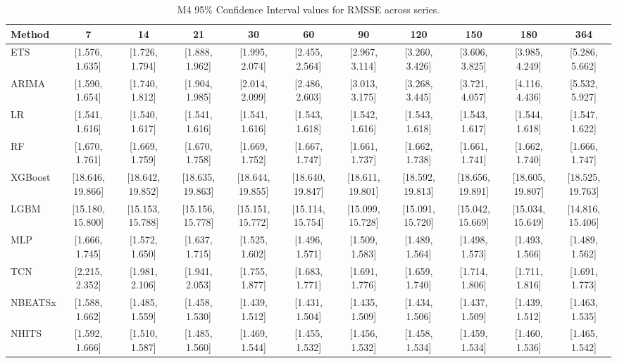 \begin{table}[!ht]
\centering
\begin{adjustbox}{max width=\textwidth}
\begin{tabular}{lcccccccccc}
\toprule
Method & 7 & 14 & 21 & 30 & 60 & 90 & 120 & 150 & 180 & 364 \\
\midrule
ETS & [1.576, 1.635] & [1.726, 1.794] & [1.888, 1.962] & [1.995, 2.074] & [2.455, 2.564] & [2.967, 3.114] & [3.260, 3.426] & [3.606, 3.825] & [3.985, 4.249] & [5.286, 5.662] \\
ARIMA & [1.590, 1.654] & [1.740, 1.812] & [1.904, 1.985] & [2.014, 2.099] & [2.486, 2.603] & [3.013, 3.175] & [3.268, 3.445] & [3.721, 4.057] & [4.116, 4.436] & [5.532, 5.927] \\
LR & [1.541, 1.616] & [1.540, 1.617] & [1.541, 1.616] & [1.541, 1.616] & [1.543, 1.618] & [1.542, 1.616] & [1.543, 1.618] & [1.543, 1.617] & [1.544, 1.618] & [1.547, 1.622] \\
RF & [1.670, 1.761] & [1.669, 1.759] & [1.670, 1.758] & [1.669, 1.752] & [1.667, 1.747] & [1.661, 1.737] & [1.662, 1.738] & [1.661, 1.741] & [1.662, 1.740] & [1.666, 1.747] \\
XGBoost & [18.646, 19.866] & [18.642, 19.852] & [18.635, 19.863] & [18.644, 19.855] & [18.640, 19.847] & [18.611, 19.801] & [18.592, 19.813] & [18.656, 19.891] & [18.605, 19.807] & [18.525, 19.763] \\
LGBM & [15.180, 15.800] & [15.153, 15.788] & [15.156, 15.778] & [15.151, 15.772] & [15.114, 15.754] & [15.099, 15.728] & [15.091, 15.720] & [15.042, 15.669] & [15.034, 15.649] & [14.816, 15.406] \\
MLP & [1.666, 1.745] & [1.572, 1.650] & [1.637, 1.715] & [1.525, 1.602] & [1.496, 1.571] & [1.509, 1.583] & [1.489, 1.564] & [1.498, 1.573] & [1.493, 1.566] & [1.489, 1.562] \\
TCN & [2.215, 2.352] & [1.981, 2.106] & [1.941, 2.053] & [1.755, 1.877] & [1.683, 1.771] & [1.691, 1.776] & [1.659, 1.740] & [1.714, 1.806] & [1.711, 1.816] & [1.691, 1.773] \\
NBEATSx & [1.588, 1.662] & [1.485, 1.559] & [1.458, 1.530] & [1.439, 1.512] & [1.431, 1.504] & [1.435, 1.509] & [1.434, 1.506] & [1.437, 1.509] & [1.439, 1.512] & [1.463, 1.535] \\
NHITS & [1.592, 1.666] & [1.510, 1.587] & [1.485, 1.560] & [1.469, 1.544] & [1.455, 1.532] & [1.456, 1.532] & [1.458, 1.534] & [1.459, 1.534] & [1.460, 1.536] & [1.465, 1.542] \\
\bottomrule
\end{tabular}
\end{adjustbox}
\caption{M4 95\% Confidence Interval values for RMSSE across series.}
\label{tab:ci_m4_rmsse}
\end{table}

